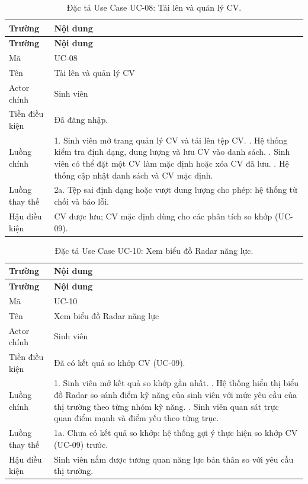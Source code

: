 \begin{longtable}{|L{3.5cm}|L{10cm}|}
\caption{Đặc tả Use Case UC-08: Tải lên và quản lý CV.}
\label{tab:uc08} \\
\hline
\textbf{Trường} & \textbf{Nội dung} \\
\hline
\endfirsthead
\hline
\textbf{Trường} & \textbf{Nội dung} \\
\hline
\endhead
Mã & UC-08 \\
\hline
Tên & Tải lên và quản lý CV \\
\hline
Actor chính & Sinh viên \\
\hline
Tiền điều kiện & Đã đăng nhập. \\
\hline
Luồng chính & 1. Sinh viên mở trang quản lý CV và tải lên tệp CV. . Hệ thống kiểm tra định dạng, dung lượng và lưu CV vào danh sách. . Sinh viên có thể đặt một CV làm mặc định hoặc xóa CV đã lưu. . Hệ thống cập nhật danh sách và CV mặc định. \\
\hline
Luồng thay thế & 2a. Tệp sai định dạng hoặc vượt dung lượng cho phép: hệ thống từ chối và báo lỗi. \\
\hline
Hậu điều kiện & CV được lưu; CV mặc định dùng cho các phân tích so khớp (UC-09). \\
\hline
\end{longtable}

\begin{longtable}{|L{3.5cm}|L{10cm}|}
\caption{Đặc tả Use Case UC-10: Xem biểu đồ Radar năng lực.}
\label{tab:uc10} \\
\hline
\textbf{Trường} & \textbf{Nội dung} \\
\hline
\endfirsthead
\hline
\textbf{Trường} & \textbf{Nội dung} \\
\hline
\endhead
Mã & UC-10 \\
\hline
Tên & Xem biểu đồ Radar năng lực \\
\hline
Actor chính & Sinh viên \\
\hline
Tiền điều kiện & Đã có kết quả so khớp CV (UC-09). \\
\hline
Luồng chính & 1. Sinh viên mở kết quả so khớp gần nhất. . Hệ thống hiển thị biểu đồ Radar so sánh điểm kỹ năng của sinh viên với mức yêu cầu của thị trường theo từng nhóm kỹ năng. . Sinh viên quan sát trực quan điểm mạnh và điểm yếu theo từng trục. \\
\hline
Luồng thay thế & 1a. Chưa có kết quả so khớp: hệ thống gợi ý thực hiện so khớp CV (UC-09) trước. \\
\hline
Hậu điều kiện & Sinh viên nắm được tương quan năng lực bản thân so với yêu cầu thị trường. \\
\hline
\end{longtable}

